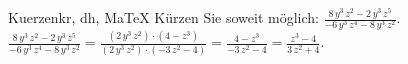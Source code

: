 \begin{MAufgabe}{Kuerzen}{kr, dh, MaTeX}
K\"urzen Sie soweit m\"oglich: $\frac{8\, y^3\, z^2 - 2\, y^3\, z^5}{ - 6\, y^3\, z^4 - 8\, y^3\, z^2}$.\\ 
\ifLsg\MLoesung
\quad $\frac{8\, y^3\, z^2 - 2\, y^3\, z^5}{ - 6\, y^3\, z^4 - 8\, y^3\, z^2}=\frac{(2\, y^3\, z^2)\cdot(4 - z^3)}{(2\, y^3\, z^2)\cdot( - 3\, z^2 - 4)}=\frac{4 - z^3}{ - 3\, z^2 - 4}=\frac{z^3 - 4}{3\, z^2 + 4}$.\else\relax\fi
 \end{MAufgabe}